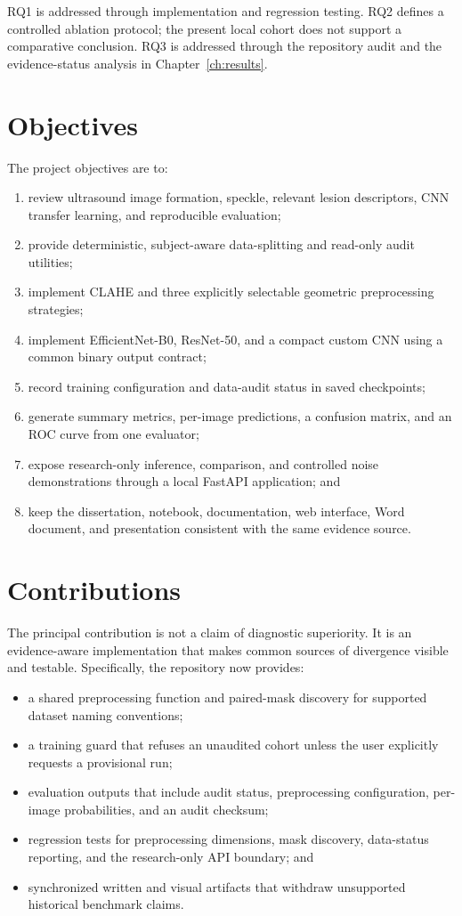 RQ1 is addressed through implementation and regression testing. RQ2 defines a controlled ablation protocol; the present local cohort does not support a comparative conclusion. RQ3 is addressed through the repository audit and the evidence-status analysis in Chapter~\ref{ch:results}.

\section{Objectives}
The project objectives are to:

\begin{enumerate}
    \item review ultrasound image formation, speckle, relevant lesion descriptors, CNN transfer learning, and reproducible evaluation;
    \item provide deterministic, subject-aware data-splitting and read-only audit utilities;
    \item implement CLAHE and three explicitly selectable geometric preprocessing strategies;
    \item implement EfficientNet-B0, ResNet-50, and a compact custom CNN using a common binary output contract;
    \item record training configuration and data-audit status in saved checkpoints;
    \item generate summary metrics, per-image predictions, a confusion matrix, and an ROC curve from one evaluator;
    \item expose research-only inference, comparison, and controlled noise demonstrations through a local FastAPI application; and
    \item keep the dissertation, notebook, documentation, web interface, Word document, and presentation consistent with the same evidence source.
\end{enumerate}

\section{Contributions}
The principal contribution is not a claim of diagnostic superiority. It is an evidence-aware implementation that makes common sources of divergence visible and testable. Specifically, the repository now provides:

\begin{itemize}
    \item a shared preprocessing function and paired-mask discovery for supported dataset naming conventions;
    \item a training guard that refuses an unaudited cohort unless the user explicitly requests a provisional run;
    \item evaluation outputs that include audit status, preprocessing configuration, per-image probabilities, and an audit checksum;
    \item regression tests for preprocessing dimensions, mask discovery, data-status reporting, and the research-only API boundary; and
    \item synchronized written and visual artifacts that withdraw unsupported historical benchmark claims.
\end{itemize}

